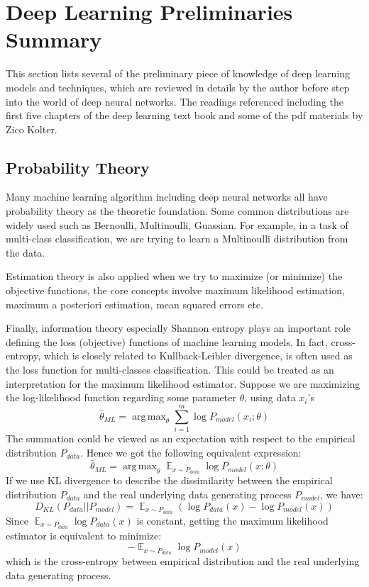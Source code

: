 \documentclass[11pt]{article}
\theoremstyle{plain}
\DeclareMathOperator*{\argmax}{arg\,max}
\DeclareMathOperator*{\E}{\mathbb{E}}
\begin{document}
\section{Deep Learning Preliminaries Summary}
\label{s:pre}

This section lists several of the preliminary piece of knowledge of deep 
learning models and techniques, which are reviewed in details by the author 
before step into the world of deep neural networks. The readings referenced 
including the first five chapters of the deep learning text book 
\cite{Goodfellow-et-al-2016} and some of the pdf materials by Zico Kolter. 

\subsection{Probability Theory}

Many machine learning algorithm including deep neural networks all have 
probability theory as the theoretic foundation. Some common distributions 
are widely used such as Bernoulli, Multinoulli, Guassian. For example, in a 
task of multi-class classification, we are trying to learn a Multinoulli 
distribution from the data. 

Estimation theory is also applied when we try to maximize (or minimize) the 
objective functions, the core concepts involve maximum likelihood 
estimation, maximum a posteriori estimation, mean squared errors etc. 

Finally, information theory especially Shannon entropy plays an important 
role defining the loss (objective) functions of machine learning models. In 
fact, cross-entropy, which is closely related to Kullback-Leibler divergence, is 
often used as the loss function for multi-classes classification. This could be 
treated as an interpretation for the maximum likelihood estimator. Suppose 
we are maximizing the log-likelihood function regarding some parameter 
$\theta$, using data $x_i$'s
\[
\hat{\theta}_{ML}=\argmax_{\theta} \sum_{i=1}^{m} \log P_{model}(x_i; \theta)
\]
The summation could be viewed as an expectation with respect to the 
empirical distribution $P_{data}$. Hence we got the following equivalent 
expression: 
\[
\hat{\theta}_{ML}=\argmax_{\theta} \E_{x\sim P_{data}} \log P_{model}(x; 
\theta)
\]
If we use KL divergence to describe the dissimilarity between the empirical 
distribution $P_{data}$ and the real underlying data generating process 
$P_{model}$, we have:
\[
D_{KL}(P_{data}||P_{model})=\E_{x\sim P_{data}} (\log P_{data}(x) - \log 
P_{model}(x))
\]
Since $\E_{x\sim P_{data}} \log P_{data}(x)$ is constant, getting the maximum 
likelihood estimator is equivalent to minimize:
\[
-\E_{x\sim P_{data}} \log P_{model}(x)
\]
which is the cross-entropy between empirical 
distribution and the real underlying data generating process.
\end{document}
